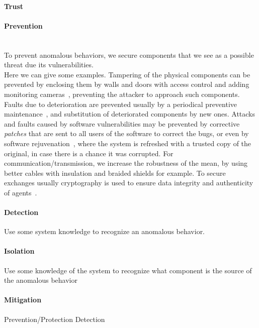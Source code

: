 \documentclass[../main.tex]{subfiles}
\begin{document}
\paragraph{Trust}

\paragraph{Prevention}
~\\To prevent anomalous behaviors, we secure components that we see as a possible threat due its vulnerabilities.
\\Here we can give some examples.
Tampering of the physical components can be prevented by enclosing them by walls and doors with access control and adding monitoring cameras~\cite{CardenasEtAl2008,DingEtAl2018}, preventing the attacker to approach such components.
Faults due to deterioration are prevented usually by a periodical preventive maintenance~\cite{ChenEtAl2021}, and substitution of deteriorated components by new ones.
Attacks and faults caused by software vulnerabilities may be prevented by corrective \emph{patches} that are sent to all users of the software to correct the bugs, or even by software rejuvenation~\cite{GriffioenEtAl2020}, where the system is refreshed with a trusted copy of the original, in case there is a chance it was corrupted.
For communication/transmission, we increase the robustness of the mean, by using better cables with insulation and braided shields for example.
To secure exchanges usually cryptography is used to ensure data integrity and authenticity of agents~\cite{DingEtAl2018}.

\paragraph{Detection}
Use some system knowledge to recognize an anomalous behavior.

\paragraph{Isolation}
Use some  knowledge of the system to recognize what component is the source of the anomalous behavior

\paragraph{Mitigation}





Prevention/Protection
Detection
\end{document}
